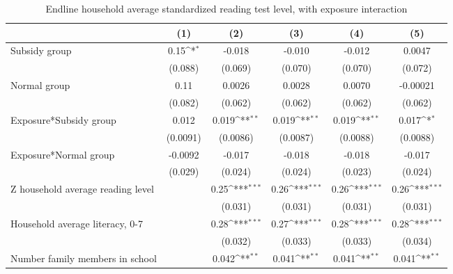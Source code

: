 \begin{table}[htbp]\centering
\def\sym#1{\ifmmode^{#1}\else\(^{#1}\)\fi}
\caption{Endline household average standardized reading test level, with exposure interaction}
\begin{tabular*}{1\hsize}{@{\hskip\tabcolsep\extracolsep\fill}l*{5}{c}}
\toprule
                &\multicolumn{1}{c}{(1)}         &\multicolumn{1}{c}{(2)}         &\multicolumn{1}{c}{(3)}         &\multicolumn{1}{c}{(4)}         &\multicolumn{1}{c}{(5)}         \\
\midrule
Subsidy group   &     0.15\sym{*}  &   -0.018         &   -0.010         &   -0.012         &   0.0047         \\
                &  (0.088)         &  (0.069)         &  (0.070)         &  (0.070)         &  (0.072)         \\
Normal group    &     0.11         &   0.0026         &   0.0028         &   0.0070         & -0.00021         \\
                &  (0.082)         &  (0.062)         &  (0.062)         &  (0.062)         &  (0.062)         \\
Exposure*Subsidy group&    0.012         &    0.019\sym{**} &    0.019\sym{**} &    0.019\sym{**} &    0.017\sym{*}  \\
                & (0.0091)         & (0.0086)         & (0.0087)         & (0.0088)         & (0.0088)         \\
Exposure*Normal group&  -0.0092         &   -0.017         &   -0.018         &   -0.018         &   -0.017         \\
                &  (0.029)         &  (0.024)         &  (0.024)         &  (0.023)         &  (0.024)         \\
Z household average reading level&                  &     0.25\sym{***}&     0.26\sym{***}&     0.26\sym{***}&     0.26\sym{***}\\
                &                  &  (0.031)         &  (0.031)         &  (0.031)         &  (0.031)         \\
Household average literacy, 0-7&                  &     0.28\sym{***}&     0.27\sym{***}&     0.28\sym{***}&     0.28\sym{***}\\
                &                  &  (0.032)         &  (0.033)         &  (0.033)         &  (0.034)         \\
Number family members in school&                  &    0.042\sym{**} &    0.041\sym{**} &    0.041\sym{**} &    0.041\sym{**} \\

\end{tabular*}
\end{table}
